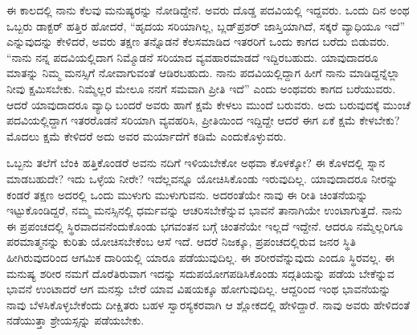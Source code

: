 ಈ ಕಾಲದಲ್ಲಿ ನಾನು ಕೆಲವು ಮನುಷ್ಯರನ್ನು ನೋಡಿದ್ದೇನೆ. ಅವರು ದೊಡ್ಡ ಪದವಿಯಲ್ಲಿ ಇದ್ದವರು. ಒಂದು ದಿನ ಅಂಥ ಒಬ್ಬರು ಡಾಕ್ಟರ್ ಹತ್ತಿರ ಹೋದರೆ, ``ಹೃದಯ ಸರಿಯಾಗಿಲ್ಲ, ಬ್ಲಡ್‌ಪ್ರಶರ್ ಜಾಸ್ತಿಯಾಗಿದೆ, ಸಕ್ಕರೆ ವ್ಯಾಧಿಯೂ ಇದೆ'' ಎನ್ನುವುದನ್ನು ಕೇಳಿದರೆ, ಅವರು ತಕ್ಷಣ ತನ್ನೊಡನೆ ಕೆಲಸಮಾಡಿದ ಇತರರಿಗೆ ಒಂದು ಕಾಗದ ಬರೆದು ಬಿಡುವರು. ``ನಾನು ನನ್ನ ಪದವಿಯಲ್ಲಿದಾಗ ನಿಮ್ಮೊಡನೆ ಸರಿಯಾದ ವ್ಯವಹಾರಮಾಡದೆ ಇದ್ದಿರಬಹುದು. ಯಾವುದಾದರೂ ಮಾತನ್ನು ನಿಮ್ಮ ಮನಸ್ಸಿಗೆ ನೋವಾಗುವಂತೆ ಆಡಿರಬಹುದು. ನಾನು ಪದವಿಯಲ್ಲಿದ್ದಾಗ ಹೀಗೆ ನಾನು ಮಾಡಿದ್ದನ್ನೆಲ್ಲಾ ನೀವು ಕ್ಷಮಿಸಬೇಕು. ನಿಮ್ಮೆಲ್ಲರ ಮೇಲೂ ನನಗೆ ಸಮವಾಗಿ ಪ್ರೀತಿ ಇದೆ'' ಎಂದು ಅಂಥವರು ಕಾಗದ ಬರೆಯುವರು. ಆದರೆ ಯಾವುದಾದರೂ ವ್ಯಾಧಿ ಬಂದರೆ ಅವರು ಹಾಗೆ ಕ್ಷಮೆ ಕೇಳಲು ಮುಂದೆ ಬರುವರು. ಅದು ಬರುವುದಕ್ಕೆ ಮುಂಚೆ ಪದವಿಯಲ್ಲಿದ್ದಾಗ ಇತರರೊಡನೆ ಸರಿಯಾಗಿ ವ್ಯವಹರಿಸಿ, ಪ್ರೀತಿಯಿಂದ ಇದ್ದಿದ್ದೇ ಆದರೆ ಈಗ ಏಕೆ ಕ್ಷಮೆ ಕೇಳಬೇಕು? ಮೊದಲು ಕ್ಷಮೆ ಕೇಳಿದರೆ ಅದು ಅವರ ಮರ್ಯಾದೆಗೆ ಕಡಿಮೆ ಎಂದುಕೊಳ್ಳುವರು.

ಒಬ್ಬನು ತಲೆಗೆ ಬೆಂಕಿ ಹತ್ತಿಕೊಂಡರೆ ಅವನು ನದಿಗೆ ಇಳಿಯಬೇಕೋ ಅಥವಾ ಕೊಳಕ್ಕೋ? ಈ ಕೊಳದಲ್ಲಿ ಸ್ನಾನ ಮಾಡಬಹುದೇ? ಇದು ಒಳ್ಳೆಯ ನೀರೇ? ಇದೆಲ್ಲವನ್ನೂ ಯೋಚಿಸಿಕೊಂಡು ಇರುವುದಿಲ್ಲ. ಯಾವುದಾದರೂ ನೀರನ್ನು ಕಂಡರೆ ತಕ್ಷಣ ಅದರಲ್ಲಿ ಒಂದು ಮುಳುಗು ಮುಳುಗುವನು. ಅದರಂತೆಯೇ ನಾವು ಈ ರೀತಿ ಚಿಂತನೆಯನ್ನು ಇಟ್ಟುಕೊಂಡಿದ್ದರೆ, ನಮ್ಮ ಮನಸ್ಸಿನಲ್ಲಿ ಧರ್ಮವನ್ನು ಆಚರಿಸಬೇಕೆನ್ನುವ ಭಾವನೆ ತಾನಾಗಿಯೇ ಉಂಟಾಗುತ್ತದೆ. ನಾನು ಈ ಪ್ರಪಂಚದಲ್ಲಿ ಸ್ಥಿರವಾದವನೆಂದುಕೊಂಡು ಭಗವಂತನ ಬಗ್ಗೆ ಚಿಂತನೆಯೇ ಇಲ್ಲದೆ ಇದ್ದೇನೆ. ಆದರೂ ನಮ್ಮೆಲ್ಲರಿಗೂ ಪರಮಾತ್ಮನನ್ನು ಕುರಿತು ಯೋಚಿಸಬೇಕೆಂಬ ಆಸೆ ಇದೆ. ಆದರೆ ನಿಜಕ್ಕೂ, ಪ್ರಪಂಚದಲ್ಲಿರುವ ಜನರ ಸ್ಥಿತಿ ಹೀಗಿರುವುದರಿಂದ ಆಗಮಿಕ ದಾರಿಯಲ್ಲಿ ಯಾರೂ ಪಡೆಯುವುದಿಲ್ಲ. ಈ ಶರೀರವೆನ್ನುವುದು ಎಂದೂ ಸ್ಥಿರವಲ್ಲ. ಈ ಮನುಷ್ಯ ಶರೀರ ನಮಗೆ ದೊರೆತಿರುವಾಗ ಇದನ್ನು ಸದುಪಯೋಗಪಡಿಸಿಕೊಂಡು ಸದ್ಗತಿಯನ್ನು ಪಡೆಯ ಬೇಕೆನ್ನುವ ಭಾವನೆ ಉಂಟಾದರೆ ಆಗ ಮನಸ್ಸು ಬೇರೆ ಯಾವ ವಿಷಯಕ್ಕೂ ಹೋಗುವುದಿಲ್ಲ. ಆದ್ದರಿಂದ ಇಂಥ ಭಾವನೆಯನ್ನು ನಾವು ಬೆಳಸಿಕೊಳ್ಳಬೇಕೆಂದು ದೀಕ್ಷಿತರು ಬಹಳ ಸ್ವಾರಸ್ಯಕರವಾಗಿ ಆ ಶ್ಲೋಕದಲ್ಲಿ ಹೇಳಿದ್ದಾರೆ. ನಾವು ಅವರು ಹೇಳಿದಂತೆ ನಡೆಯುತ್ತಾ ಶ್ರೇಯಸ್ಸನ್ನು ಪಡೆಯಬೇಕು.













































 

